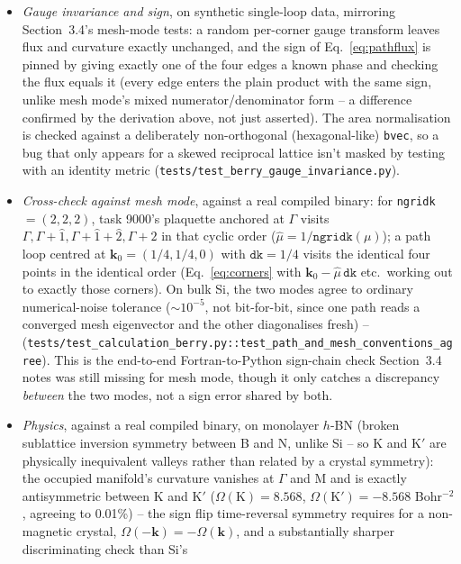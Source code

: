 \documentclass[11pt]{article}
\begin{document}
\begin{itemize}
  \item \emph{Gauge invariance and sign}, on synthetic single-loop data, mirroring
    Section~3.4's mesh-mode tests: a random per-corner gauge transform leaves flux and
    curvature exactly unchanged, and the sign of Eq.~\eqref{eq:pathflux} is pinned by
    giving exactly one of the four edges a known phase and checking the flux equals it
    (every edge enters the plain product with the same sign, unlike mesh mode's mixed
    numerator/denominator form -- a difference confirmed by the derivation above, not
    just asserted). The area normalisation is checked against a deliberately
    non-orthogonal (hexagonal-like) \texttt{bvec}, so a bug that only appears for a
    skewed reciprocal lattice isn't masked by testing with an identity metric
    (\texttt{tests/test\_berry\_gauge\_invariance.py}).
  \item \emph{Cross-check against mesh mode}, against a real compiled binary: for
    \texttt{ngridk}$=(2,2,2)$, task 9000's plaquette anchored at $\Gamma$ visits
    $\Gamma,\Gamma+\hat1,\Gamma+\hat1+\hat2,\Gamma+\hat2$ in that cyclic order
    ($\hat\mu=1/\texttt{ngridk}(\mu)$); a path loop centred at
    $\mathbf k_0=(1/4,1/4,0)$ with $\texttt{dk}=1/4$ visits the identical four points in
    the identical order (Eq.~\eqref{eq:corners} with $\mathbf k_0-\hat\mu\,\texttt{dk}$
    etc.\ working out to exactly those corners). On bulk Si, the two modes agree to
    ordinary numerical-noise tolerance ($\sim10^{-5}$, not bit-for-bit, since one path
    reads a converged mesh eigenvector and the other diagonalises fresh) --
    (\texttt{tests/test\_calculation\_berry.py::test\_path\_and\_mesh\_conventions\_agree}).
    This is the end-to-end Fortran-to-Python sign-chain check Section~3.4 notes was
    still missing for mesh mode, though it only catches a discrepancy \emph{between} the
    two modes, not a sign error shared by both.
  \item \emph{Physics}, against a real compiled binary, on monolayer $h$-BN (broken
    sublattice inversion symmetry between B and N, unlike Si -- so K and K$'$ are
    physically inequivalent valleys rather than related by a crystal symmetry): the
    occupied manifold's curvature vanishes at $\Gamma$ and M and is exactly
    antisymmetric between K and K$'$ ($\Omega(\mathrm K)=8.568$,
    $\Omega(\mathrm K')=-8.568$ Bohr$^{-2}$, agreeing to 0.01\%) -- the sign flip
    time-reversal symmetry requires for a non-magnetic crystal, $\Omega(-\mathbf
    k)=-\Omega(\mathbf k)$, and a substantially sharper discriminating check than Si's

\end{itemize}
\end{document}
